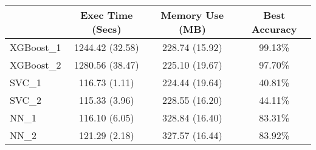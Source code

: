 
\begin{tabular}{|l|c|c|c|} 
\hline
 & \textbf{Exec Time (Secs)} & \textbf{Memory Use (MB)} & \textbf{Best Accuracy}\\
\hline
\hline
XGBoost\_1 & 1244.42 (32.58) & 228.74 (15.92) & 99.13\% \\
\hline
XGBoost\_2 & 1280.56 (38.47) & 225.10 (19.67) & 97.70\% \\
\hline
SVC\_1 & 116.73 (1.11) & 224.44 (19.64) & 40.81\% \\
\hline
SVC\_2 & 115.33 (3.96) & 228.55 (16.20) & 44.11\% \\
\hline
NN\_1 & 116.10 (6.05) & 328.84 (16.40) & 83.31\% \\
\hline
NN\_2 & 121.29 (2.18) & 327.57 (16.44) & 83.92\% \\
\hline

\end{tabular}

